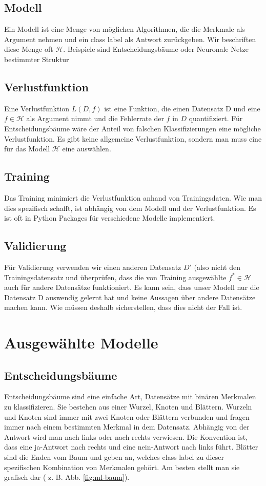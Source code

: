 \subsection{Modell}
Ein Modell ist eine Menge von möglichen Algorithmen, die die Merkmale als Argument nehmen und ein class label als Antwort zurückgeben. Wir beschriften diese Menge oft $\mathcal{H}$. Beispiele sind Entscheidungsbäume oder Neuronale Netze bestimmter Struktur  

\subsection{Verlustfunktion}
Eine Verlustfunktion $L(D,f)$ ist eine Funktion, die einen Datensatz D und eine $f \in \mathcal{H}$ als Argument nimmt und die Fehlerrate der $f$ in $D$ quantifiziert. Für Entscheidungsbäume wäre der Anteil von falschen Klassifizierungen eine mögliche Verlustfunktion. Es gibt keine allgemeine Verlustfunktion, sondern man muss eine für das Modell $\mathcal{H}$ eine auswählen.

\subsection{Training}
Das Training minimiert die Verlustfunktion anhand von Trainingsdaten. Wie man dies spezifisch schafft, ist abhängig von dem Modell und der Verlustfunktion. Es ist oft in Python Packages für verschiedene Modelle implementiert.

\subsection{Validierung}
Für Validierung verwenden wir einen anderen Datensatz $D'$ (also nicht den Trainingsdatensatz und überprüfen, dass die von Training ausgewählte $f^* \in \mathcal{H}$ auch für andere Datensätze funktioniert. Es kann sein, dass unser Modell nur die Datensatz D auswendig gelernt hat und keine Aussagen über andere Datensätze machen kann. Wie müssen deshalb sicherstellen, dass dies nicht der Fall ist.
\section{Ausgewählte Modelle}\label{ml:modelle}
\subsection{Entscheidungsbäume}
Entscheidungsbäume sind eine einfache Art, Datensätze mit binären Merkmalen zu klassifizieren. Sie bestehen aus einer Wurzel, Knoten und Blättern. 
Wurzeln und Knoten sind immer mit zwei Knoten oder Blättern verbunden und fragen immer nach einem bestimmten Merkmal in dem Datensatz. Abhängig von der Antwort wird man nach links oder nach rechts verwiesen. Die Konvention ist, dass eine ja-Antwort nach rechts und eine nein-Antwort nach links führt. Blätter sind die Enden vom Baum und geben  an, welches class label zu dieser spezifischen Kombination von Merkmalen gehört. Am besten stellt man sie grafisch dar ( z. B. Abb. \ref{fig:ml-baum}).\\

